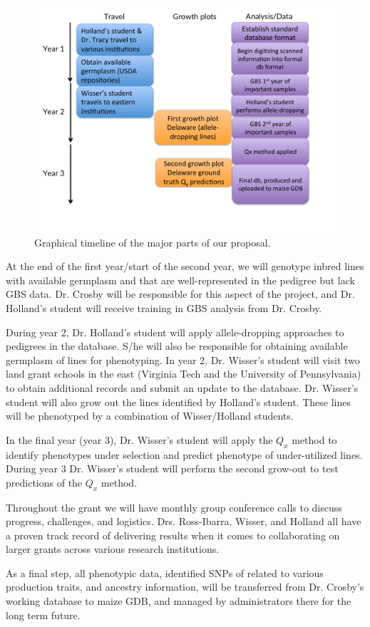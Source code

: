 \documentclass[12pt]{article}
\begin{document}
\begin{figure}
\centering
\includegraphics[width=0.7\linewidth]{timeline.pdf}
\caption{Graphical timeline of the major parts of our proposal.}
\label{fig:timeline}
\end{figure}

At the end of the first year/start of the second year, we will genotype inbred lines with available germplasm and that are well-represented in the pedigree but lack GBS data. 
Dr. Crosby will be responsible for this aspect of the project, and Dr. Holland's student will receive training in GBS analysis from Dr. Crosby. 

During year 2, Dr. Holland's student will apply allele-dropping approaches to pedigrees in the database. 
S/he will also be responsible for obtaining available germplasm of lines for phenotyping. 
In year 2, Dr. Wisser's student will visit two land grant schools in the east (Virginia Tech and the University of Pennsylvania) to obtain additional records and submit an update to the database. 
Dr. Wisser's student will also grow out the lines identified by Holland's student. 
These lines will be phenotyped by a combination of Wisser/Holland students.

In the final year (year 3), Dr. Wisser's student will apply the $Q_{x}$ method to identify phenotypes under selection and predict phenotype of under-utilized lines.
During year 3 Dr. Wisser's student will perform the second grow-out to test predictions of the $Q_{x}$ method.

Throughout the grant we will have monthly group conference calls to discuss progress, challenges, and logistics. 
Drs. Ross-Ibarra, Wisser, and Holland all have a proven track record of delivering results when it comes to collaborating on larger grants across various research institutions. 

As a final step, all phenotypic data, identified SNPs of related to various production traits, and ancestry information, will be transferred from Dr. Crosby's working database to maize GDB, and managed by administrators there for the long term future.
\end{document}
